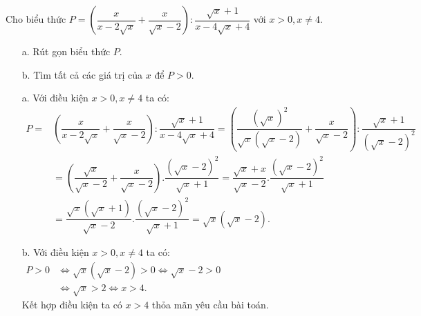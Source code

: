\begin{ex}
\newline
Cho biểu thức $P=\left(\dfrac{x}{x-2\sqrt{x}}+\dfrac{x}{\sqrt{x}-2}\right):\dfrac{\sqrt{x}+1}{x-4\sqrt{x}+4}$ với $x>0,x\ne 4$.
    \begin{enumerate}    
        \item[a.] Rút gọn biểu thức $P$.
        \item[b.] Tìm tất cả các giá trị của $x$ để $P>0$.
    \end{enumerate}
\loigiai
    {
    \begin{enumerate}
        \item[a.] Với điều kiện $x>0,x\ne 4$ ta có:\\
        $
        \begin{aligned}
        P=&\left(\dfrac{x}{x-2\sqrt{x}}+\dfrac{x}{\sqrt{x}-2}\right):\dfrac{\sqrt{x}+1}{x-4\sqrt{x}+4}
        =\left(\dfrac{\left(\sqrt{x}\right)^2}{\sqrt{x}\left(\sqrt{x}-2\right)}+\dfrac{x}{\sqrt{x}-2}\right):\dfrac{\sqrt{x}+1}{\left(\sqrt{x}-2\right)^2}\\
        &=\left(\dfrac{\sqrt{x}}{\sqrt{x}-2}+\dfrac{x}{\sqrt{x}-2}\right).\dfrac{\left(\sqrt{x}-2\right)^2}{\sqrt{x}+1}
        =\dfrac{\sqrt{x}+x}{\sqrt{x}-2}.\dfrac{\left(\sqrt{x}-2\right)^2}{\sqrt{x}+1}\\
        &=\dfrac{\sqrt{x}\left(\sqrt{x}+1\right)}{\sqrt{x}-2}.\dfrac{\left(\sqrt{x}-2\right)^2}{\sqrt{x}+1}=\sqrt{x}\left(\sqrt{x}-2\right).
        \end{aligned}
        $
        \item [b.] Với điều kiện $x>0,x\ne 4$ ta có:\\
         $
        \begin{aligned}
        P>0&\Leftrightarrow\sqrt{x}\left(\sqrt{x}-2\right)>0\Leftrightarrow \sqrt{x}-2>0\\
        &\Leftrightarrow \sqrt{x}>2\Leftrightarrow x>4.
        \end{aligned}
        $\\
        Kết hợp điều kiện ta có $x>4$ thỏa mãn yêu cầu bài toán.
    \end{enumerate}
    }
\end{ex}

